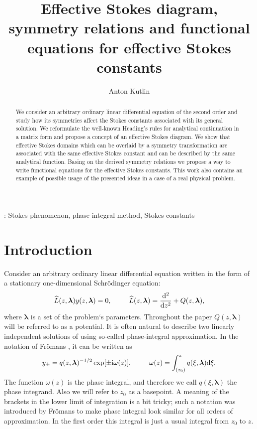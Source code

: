 \documentclass[12pt]{iopart}
\def\L{\widehat{L}}
\def\lmbd{\bm{\lambda}}
\def\w{\omega}
\newcommand\phsintgrnd[1][z]{q(#1,\lmbd)}
\newcommand\predexp[1][z]{q(#1,\lmbd)^{-1/2}}
\newcommand\phsintgrl[3][z]{\int_{#2}^{#3} \phsintgrnd[#1] \rmd #1}
\begin{document}
\title[Effective Stokes diagram and symmetry relations for effective Stokes constants]{Effective Stokes diagram, symmetry relations and functional equations for effective Stokes constants}
\author{Anton Kutlin}

\address{Institute of Applied Physics of Russian Academy of Sciences, 46 Ulyanov str., 603950 Nizhny Novgorod, Russia}



\begin{abstract}
We consider an arbitrary ordinary linear differential equation of the second order and study 
how its symmetries affect the Stokes constants associated with its general solution. 
We reformulate the well-known Heading's rules for analytical continuation in a matrix form 
and propose a concept of an effective Stokes diagram. We show that effective Stokes 
domains which can be overlaid by a symmetry transformation are associated with the same 
effective Stokes constant and can be described by the same analytical function. Basing on
the derived symmetry relations we propose a way to write functional equations for 
the effective Stokes constants. This work also contains an example of possible usage 
of the presented ideas in a case of a real physical problem.
\end{abstract}

\submitto{\jpa}

: Stokes phenomenon, phase-integral method, Stokes constants


\section{Introduction \label{sec:intro}}
Consider an arbitrary ordinary linear differential equation written in the form of 
a stationary one-dimensional Schr\"odinger equation:
\begin{eqnarray}
\L(z,\lmbd)y(z,\lmbd)=0, \qquad \L(z,\lmbd)=\frac{\rmd^2}{\rmd z^2} + Q(z,\lmbd),   \label{eq:gen}
\end{eqnarray}
where $\lmbd$ is a set of the problem`s parameters. Throughout the paper 
$Q(z,\lmbd)$ will be referred to as a potential. It is often natural to describe two 
linearly independent solutions of  using so-called phase-integral 
approximation. In the notation of Fr\"omans \cite{frbook}, it can be written as
\begin{eqnarray}
y_\pm = \predexp \exp [\pm \rmi \w(z)], \qquad \w(z)=\phsintgrl[\xi]{(z_0)}{z}.   \label{eq:phsint}
\end{eqnarray}
The function $\w(z)$ is the phase integral, and therefore we call $\phsintgrnd[\xi]$ 
the phase integrand. Also we will refer to $z_0$ as a basepoint. A meaning of the brackets in the 
lower limit of integration is a bit tricky; such a notation was introduced by Fr\"omans \cite{frpaper} to make
phase integral look similar for all orders of approximation. In the first order this integral is just
a usual integral from $z_0$ to $z$. 
\end{document}
